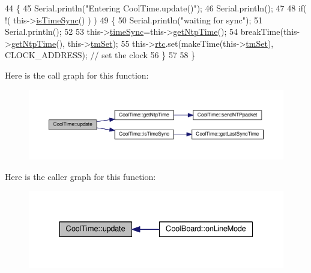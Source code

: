 \begin{DoxyCode}
44 \{
45     Serial.println(\textcolor{stringliteral}{"Entering CoolTime.update()"});
46     Serial.println();
47 
48     \textcolor{keywordflow}{if}( !( this->\hyperlink{classCoolTime_a5ae038a4498602b189f76a10bf02adf8}{isTimeSync}() ) )
49     \{
50         Serial.println(\textcolor{stringliteral}{"waiting for sync"});
51         Serial.println();
52 
53         this->\hyperlink{classCoolTime_a9d032e76c3470a15b3bbbc52af6463f7}{timeSync}=this->\hyperlink{classCoolTime_a41fbbbfd651c2079f54d4b2911e4c705}{getNtpTime}();
54         breakTime(this->\hyperlink{classCoolTime_a41fbbbfd651c2079f54d4b2911e4c705}{getNtpTime}(), this->\hyperlink{classCoolTime_ad33c2713c903ff064ad09c46406ae088}{tmSet});
55         this->\hyperlink{classCoolTime_abd38f2384ff90692b1568d9db869412e}{rtc}.set(makeTime(this->\hyperlink{classCoolTime_ad33c2713c903ff064ad09c46406ae088}{tmSet}), CLOCK\_ADDRESS); \textcolor{comment}{// set the clock}
56     \}
57     
58 \}
\end{DoxyCode}
Here is the call graph for this function\+:
\nopagebreak
\begin{figure}[H]
\begin{center}
\leavevmode
\includegraphics[width=350pt]{classCoolTime_aae601f795452cfa48d9fb337aed483a8_cgraph}
\end{center}
\end{figure}
Here is the caller graph for this function\+:
\nopagebreak
\begin{figure}[H]
\begin{center}
\leavevmode
\includegraphics[width=331pt]{classCoolTime_aae601f795452cfa48d9fb337aed483a8_icgraph}
\end{center}
\end{figure}


